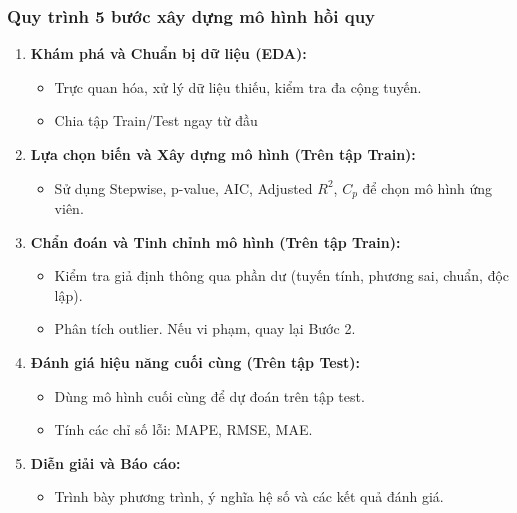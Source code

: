 \begin{frame}
    \frametitle{Quy trình 5 bước xây dựng mô hình hồi quy}
    \begin{enumerate}
        \item \textbf{Khám phá và Chuẩn bị dữ liệu (EDA):}
        \begin{itemize}
            \item Trực quan hóa, xử lý dữ liệu thiếu, kiểm tra đa cộng tuyến.
            \item Chia tập Train/Test ngay từ đầu
        \end{itemize}

        \item \textbf{Lựa chọn biến và Xây dựng mô hình (Trên tập Train):}
        \begin{itemize}
            \item Sử dụng Stepwise, p-value, AIC, Adjusted $R^2$, $C_p$ để chọn mô hình ứng viên.
        \end{itemize}

        \item \textbf{Chẩn đoán và Tinh chỉnh mô hình (Trên tập Train):}
        \begin{itemize}
            \item Kiểm tra giả định thông qua phần dư (tuyến tính, phương sai, chuẩn, độc lập).
            \item Phân tích outlier. Nếu vi phạm, quay lại Bước 2.
        \end{itemize}

        \item \textbf{Đánh giá hiệu năng cuối cùng (Trên tập Test):}
        \begin{itemize}
            \item Dùng mô hình cuối cùng để dự đoán trên tập test.
            \item Tính các chỉ số lỗi: MAPE, RMSE, MAE.
        \end{itemize}
        
        \item \textbf{Diễn giải và Báo cáo:}
        \begin{itemize}
            \item Trình bày phương trình, ý nghĩa hệ số và các kết quả đánh giá.
        \end{itemize}
    \end{enumerate}
\end{frame}